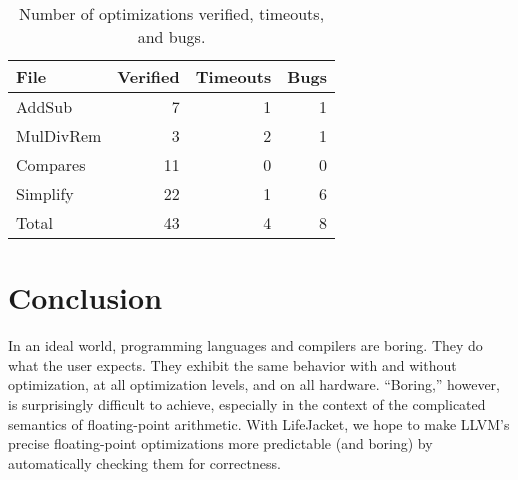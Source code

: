 \documentclass[preprint, numbers]{sigplanconf}
\newcommand{\final}[1]{#1}
\newcommand{\xxx}{LifeJacket}
\newcommand{\numverified}{43}
\newcommand{\numbugs}{8}
\begin{document}
\begin{table}
\centering
\small
\begin{tabular}{lrrr}
\toprule
File & Verified & Timeouts & Bugs \\
\midrule
AddSub & 7 & 1 & \final{1} \\
MulDivRem & \final{3} & \final{2} & \final{1} \\
Compares & \final{11} & \final{0} & \final{0} \\
Simplify & \final{22} & \final{1} & \final{6} \\
\midrule
Total & \numverified{} & 4 & \numbugs{} \\
\bottomrule
\end{tabular}

\caption{Number of optimizations verified, timeouts, and bugs.}
\label{fig:opts}

\end{table}











\section{Conclusion} In an ideal world, programming languages and compilers are
boring. They do what the user expects. They exhibit the same behavior with and
without optimization, at all optimization levels, and on all hardware.
``Boring,'' however, is surprisingly difficult to achieve, especially in the
context of the complicated semantics of floating-point arithmetic. With \xxx{},
we hope to make LLVM's precise floating-point optimizations more predictable
(and boring) by automatically checking them for correctness.




\end{document}
